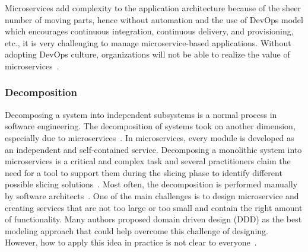 Microservices add complexity to the application architecture because of the sheer number of moving parts, hence without automation and the use of DevOps model which encourages continuous integration, continuous delivery, and provisioning, etc., it is very challenging to manage microservice-based applications. Without adopting DevOps culture, organizations will not be able to realize the value of microservices~\cite{Premchand2018}.



\subsubsection{Decomposition}%

Decomposing a system into independent subsystems is a normal process in software engineering.
The decomposition of systems took on another dimension, especially due to microservices~\cite{Fred2015, Netflix}. In microservices, every module is developed as an independent and self-contained service. Decomposing a monolithic system into microservices is a critical and complex task and several practitioners claim the need for a tool to support them during the slicing phase to identify different possible slicing solutions~\cite{Taibi2019}. Most often, the decomposition is performed manually by software architects~\cite{Zhang2019, Carvalho2019}.
One of the main challenges is to design microservice and creating services that are not too large or too small and contain the right amount of functionality. Many authors proposed domain driven design (DDD) as the best modeling approach that could help overcome this challenge of designing. However, how to apply this idea in practice is not clear to everyone~\cite{Merson2020}.




